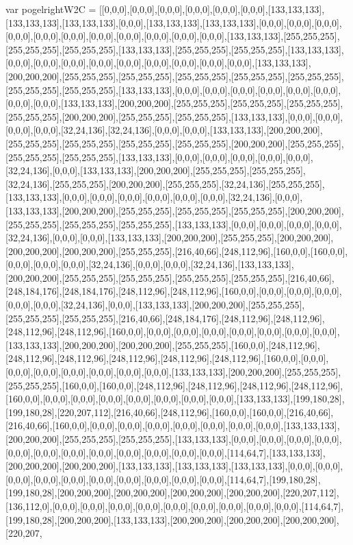 var pogelrightW2C = [[0,0,0],[0,0,0],[0,0,0],[0,0,0],[0,0,0],[0,0,0],[133,133,133],[133,133,133],[133,133,133],[0,0,0],[133,133,133],[133,133,133],[0,0,0],[0,0,0],[0,0,0],[0,0,0],[0,0,0],[0,0,0],[0,0,0],[0,0,0],[0,0,0],[0,0,0],[0,0,0],[133,133,133],[255,255,255],[255,255,255],[255,255,255],[133,133,133],[255,255,255],[255,255,255],[133,133,133],[0,0,0],[0,0,0],[0,0,0],[0,0,0],[0,0,0],[0,0,0],[0,0,0],[0,0,0],[0,0,0],[133,133,133],[200,200,200],[255,255,255],[255,255,255],[255,255,255],[255,255,255],[255,255,255],[255,255,255],[255,255,255],[133,133,133],[0,0,0],[0,0,0],[0,0,0],[0,0,0],[0,0,0],[0,0,0],[0,0,0],[0,0,0],[133,133,133],[200,200,200],[255,255,255],[255,255,255],[255,255,255],[255,255,255],[200,200,200],[255,255,255],[255,255,255],[133,133,133],[0,0,0],[0,0,0],[0,0,0],[0,0,0],[32,24,136],[32,24,136],[0,0,0],[0,0,0],[133,133,133],[200,200,200],[255,255,255],[255,255,255],[255,255,255],[255,255,255],[200,200,200],[255,255,255],[255,255,255],[255,255,255],[133,133,133],[0,0,0],[0,0,0],[0,0,0],[0,0,0],[0,0,0],[32,24,136],[0,0,0],[133,133,133],[200,200,200],[255,255,255],[255,255,255],[32,24,136],[255,255,255],[200,200,200],[255,255,255],[32,24,136],[255,255,255],[133,133,133],[0,0,0],[0,0,0],[0,0,0],[0,0,0],[0,0,0],[0,0,0],[32,24,136],[0,0,0],[133,133,133],[200,200,200],[255,255,255],[255,255,255],[255,255,255],[200,200,200],[255,255,255],[255,255,255],[255,255,255],[133,133,133],[0,0,0],[0,0,0],[0,0,0],[0,0,0],[32,24,136],[0,0,0],[0,0,0],[133,133,133],[200,200,200],[255,255,255],[200,200,200],[200,200,200],[200,200,200],[255,255,255],[216,40,66],[248,112,96],[160,0,0],[160,0,0],[0,0,0],[0,0,0],[0,0,0],[32,24,136],[0,0,0],[0,0,0],[32,24,136],[133,133,133],[200,200,200],[255,255,255],[255,255,255],[255,255,255],[255,255,255],[216,40,66],[248,184,176],[248,184,176],[248,112,96],[248,112,96],[160,0,0],[0,0,0],[0,0,0],[0,0,0],[0,0,0],[0,0,0],[32,24,136],[0,0,0],[133,133,133],[200,200,200],[255,255,255],[255,255,255],[255,255,255],[216,40,66],[248,184,176],[248,112,96],[248,112,96],[248,112,96],[248,112,96],[160,0,0],[0,0,0],[0,0,0],[0,0,0],[0,0,0],[0,0,0],[0,0,0],[0,0,0],[133,133,133],[200,200,200],[200,200,200],[255,255,255],[160,0,0],[248,112,96],[248,112,96],[248,112,96],[248,112,96],[248,112,96],[248,112,96],[160,0,0],[0,0,0],[0,0,0],[0,0,0],[0,0,0],[0,0,0],[0,0,0],[0,0,0],[133,133,133],[200,200,200],[255,255,255],[255,255,255],[160,0,0],[160,0,0],[248,112,96],[248,112,96],[248,112,96],[248,112,96],[160,0,0],[0,0,0],[0,0,0],[0,0,0],[0,0,0],[0,0,0],[0,0,0],[0,0,0],[133,133,133],[199,180,28],[199,180,28],[220,207,112],[216,40,66],[248,112,96],[160,0,0],[160,0,0],[216,40,66],[216,40,66],[160,0,0],[0,0,0],[0,0,0],[0,0,0],[0,0,0],[0,0,0],[0,0,0],[0,0,0],[133,133,133],[200,200,200],[255,255,255],[255,255,255],[133,133,133],[0,0,0],[0,0,0],[0,0,0],[0,0,0],[0,0,0],[0,0,0],[0,0,0],[0,0,0],[0,0,0],[0,0,0],[0,0,0],[0,0,0],[114,64,7],[133,133,133],[200,200,200],[200,200,200],[133,133,133],[133,133,133],[133,133,133],[0,0,0],[0,0,0],[0,0,0],[0,0,0],[0,0,0],[0,0,0],[0,0,0],[0,0,0],[0,0,0],[0,0,0],[114,64,7],[199,180,28],[199,180,28],[200,200,200],[200,200,200],[200,200,200],[200,200,200],[220,207,112],[136,112,0],[0,0,0],[0,0,0],[0,0,0],[0,0,0],[0,0,0],[0,0,0],[0,0,0],[0,0,0],[0,0,0],[114,64,7],[199,180,28],[200,200,200],[133,133,133],[200,200,200],[200,200,200],[200,200,200],[220,207,